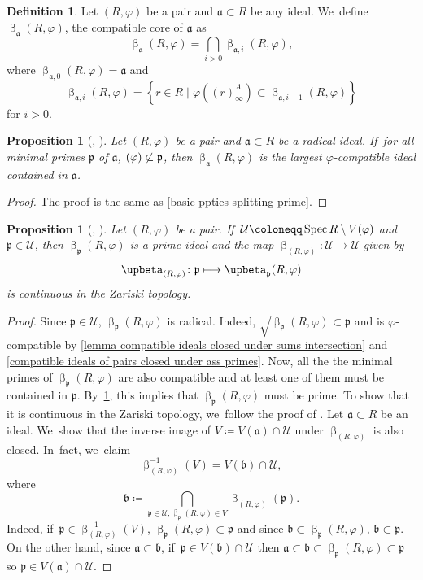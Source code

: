 \documentclass[JEP,XML,SOM,Unicode,published]{cedram}
\let\autoref\cref
\newcommand\mto{\mathchoice{\longmapsto}{\mapsto}{\mapsto}{\mapsto}}
\theoremstyle{plain}
\newtheorem{proposition}[theorem]{Proposition}
\theoremstyle{definition}
\newtheorem{definition}[theorem]{Definition}
\numberwithin{equation}{theorem}
\newcommand{\fra}{\mathfrak{a}}
\newcommand{\frab}{\mathfrak{b}}
\newcommand{\p}{\mathfrak{p}}
\let\Im\relax
\DeclareMathOperator{\Im}{Im}
\DeclareMathOperator{\Spec}{{Spec}}
\newcommand{\nsubset}{\not\subset}
\newcommand{\sU}{\mathcal{U}}
\renewcommand{\phi}{\varphi}
\newcommand{\rphi}{(R,\phi)}
\newcommand{\inv}{^{-1}}
\begin{document}
\begin{definition}
Let $\rphi$ be a pair and $\fra\subset R$ be any ideal. We~define $\upbeta_\fra\rphi$, the compatible core of $\fra$ as
\[
\upbeta_\fra\rphi=\bigcap_{i>0}\upbeta_{\fra,i}\rphi,
\]
where $\upbeta_{\fra,0}\rphi=\fra$ and
\[
\upbeta_{\fra,i}\rphi=\left\{r\in R\mid \phi\left((r)^A_\infty\right)\subset \upbeta_{\fra,i-1}\rphi\right\}
\]
for $i>0$.
\end{definition}

\begin{proposition}[{\cf \cite[Cor.\,3.14]{BrosowskyCartierCoreMap}, \cite[Prop.\,4.5]{CarvajalFayolleTameRamificationCFPS}}]\label{basic ppties compatible core}
Let $\rphi$ be a pair and $\fra\subset R$ be a radical ideal. If~for all minimal primes $\p$ of $\fra$, $\Im(\phi)\nsubset \p$, then
$\upbeta_\fra\rphi$ is the largest $\phi$-compatible ideal contained in $\fra$.
\end{proposition}

\begin{proof}
The proof is the same as \autoref{basic ppties splitting prime}.
\end{proof}

\begin{proposition}[{\cf \cite[Th.\,3.3]{BrosowskyCartierCoreMap}, \cite[Prop.\,4.14]{CarvajalFayolleTameRamificationCFPS}}]\label{compatible core as a map}
Let $\rphi$ be a pair. If~$\sU\coloneqq\Spec R\setminus V(\Im\phi)$ and $\p\in \sU$, then $\upbeta_\p\rphi$ is a prime ideal and the map $\upbeta_{\rphi}\colon \sU \to \sU$ given by
\[
\upbeta_{\rphi}\colon \p \mto \upbeta_\p\rphi
\]
is continuous in the Zariski topology.
\end{proposition}

\begin{proof}
Since $\p\in \sU$, $\upbeta_\p\rphi$ is radical. Indeed, $\sqrt{\upbeta_\p\rphi}\subset \p$ and is $\phi$-compatible by \autoref{lemma compatible ideals closed under sums intersection} and \autoref{compatible ideals of pairs closed under ass primes}. Now, all the the minimal primes of $\upbeta_\p\rphi$ are also compatible and at least one of them must be contained in $\p$. By~\autoref{basic ppties compatible core}, this implies that $\upbeta_\p\rphi$ must be prime. To show that it is continuous in the Zariski topology, we~follow the proof of \cite[Th.\,3.23]{BrosowskyCartierCoreMap}. Let $\fra\subset R$ be an ideal. We~show that the inverse image of $V\coloneqq V(\fra)\cap \sU$ under $\upbeta_{\rphi}$ is also closed. In~fact, we~claim
\[
\upbeta_{\rphi}\inv(V)= V(\frab)\cap \sU,
\]
where
\[
\frab\coloneqq \bigcap_{\p\in \sU,\upbeta_\p\rphi\in V} \upbeta_{\rphi}(\p).
\]
Indeed, if~$\p\in \upbeta_{\rphi}\inv(V)$, $\upbeta_\p\rphi\subset \p$ and since $\frab\subset \upbeta_\p\rphi$, $\frab\subset \p$. On the other hand, since $\fra\subset\frab$, if~$\p\in V(\frab)\cap \sU$ then $\fra\subset\frab\subset \upbeta_\p\rphi\subset \p$ so $\p\in V(\fra)\cap \sU$.
\end{proof}
\end{document}
